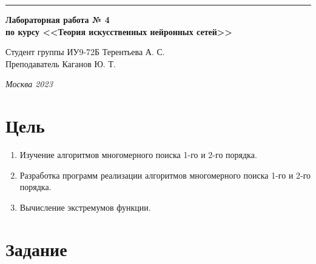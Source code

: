 \documentclass[a4paper, 14pt]{extarticle}
\begin{document}
\begin{titlepage}
\vspace*{-16pt}
\hspace{30pt}\rule{0.866\textwidth}{0.4pt}
  
\vspace{11em}

\begin{center}
\Large {\bf Лабораторная работа № 4} \\ 
\large {\bf по курсу <<Теория искусственных нейронных сетей>>} \\
\end{center}\normalsize

\vspace{8em}


\begin{flushright}
  {Студент группы ИУ9-72Б Терентьева А. С. \hspace*{15pt}\\ 
  \vspace{2ex}
  Преподаватель Каганов Ю. Т.\hspace*{15pt}}
\end{flushright}

\bigskip

\vfill
 

\begin{center}
\textsl{Москва 2023}
\end{center}
\end{titlepage}

\renewcommand{\ttdefault}{pcr}

\setlength{\tabcolsep}{3pt}
\newpage
\setcounter{page}{2}

\section{Цель}\label{Sect::purpose}
\begin{enumerate}
\item Изучение алгоритмов многомерного поиска 1-го и 2-го порядка.
\item Разработка программ реализации алгоритмов многомерного поиска 1-го и 2-го порядка.
\item Вычисление экстремумов функции.
\end{enumerate}

\section{Задание}\label{Sect::task}
\end{document}

